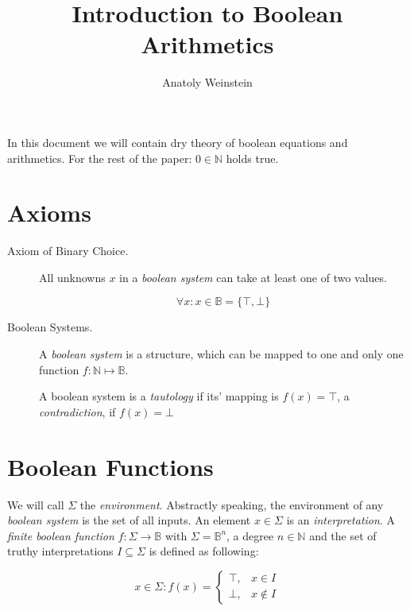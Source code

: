 \documentclass[12pt, letterpaper]{article}
\title{Introduction to Boolean Arithmetics}
\author{Anatoly Weinstein}
\begin{document}
    \maketitle

    In this document we will contain dry theory of boolean equations
    and arithmetics. For the rest of the paper: $0 \in \mathbb{N}$
    holds true.

    \section{Axioms}

    \begin{description}
        \item[Axiom of Binary Choice.] All unknowns $x$ in a
        \emph{boolean system} can take at least one of two values.
        
        \[ \forall x: x \in \mathbb{B} =\{\top,\bot\} \]

        \item[Boolean Systems.] A \emph{boolean system} is a structure,
        which can be mapped to one and only one function $f:\mathbb{N}
        \mapsto\mathbb{B}$.
        
        A boolean system is a \emph{tautology} if its' mapping is
        $f(x)=\top$, a \emph{contradiction}, if $f(x)=\bot$
    \end{description}

    

    \section{Boolean Functions}

    We will call $\Sigma$ the \emph{environment}. Abstractly speaking, the 
    environment of any \emph{boolean system} is the set of all inputs.
    An element $x\in\Sigma$ is an \emph{interpretation}. A
    \emph{finite boolean function} $f:\Sigma\to\mathbb{B}$ with $\Sigma =
    \mathbb{B}^n$, a degree $n\in \mathbb{N}$ and the set of truthy
    interpretations $I \subseteq \Sigma$ is defined as following:

    \begin{equation}
        \nonumber
        x \in \Sigma: f(x) =
        \begin{cases}
            \top, & x \in I \\
            \bot, & x \not\in I
        \end{cases}
    \end{equation}
\end{document}
